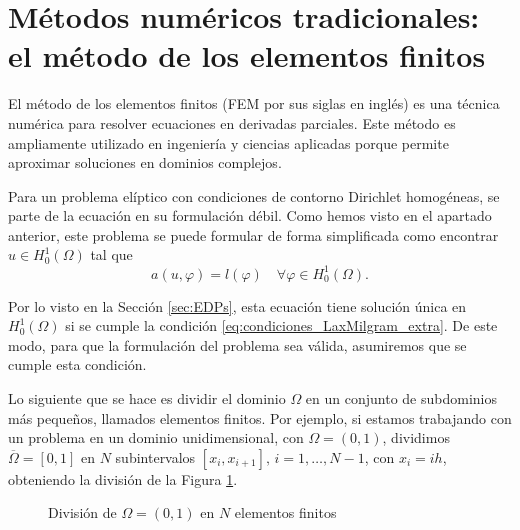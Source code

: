 \documentclass[a4paper,11pt,spanish, twoside, leqno]{tfg-uam}
\theoremstyle{definition}
\begin{document}
\section{Métodos numéricos tradicionales: el método de los elementos finitos}\label{sc:FEM}

El método de los elementos finitos (FEM por sus siglas en inglés) es una técnica numérica para resolver ecuaciones en derivadas parciales. Este método es ampliamente utilizado en ingeniería y ciencias aplicadas porque permite aproximar soluciones en dominios complejos.

Para un problema elíptico con condiciones de contorno Dirichlet homogéneas, se parte de la ecuación en su formulación débil. Como hemos visto en el apartado anterior, este problema se puede formular de forma simplificada como encontrar $u\in H_0^1(\Omega)$ tal que
\begin{equation*}
    a(u,\varphi) = l(\varphi) \quad \forall \varphi\in  H_0^1(\Omega).
\end{equation*}

Por lo visto en la Sección \ref{sec:EDPs}, esta ecuación tiene solución única en $H_0^1(\Omega)$ si se cumple la condición \eqref{eq:condiciones_LaxMilgram_extra}. De este modo, para que la formulación del problema sea válida, asumiremos que se cumple esta condición.

Lo siguiente que se hace es dividir el dominio $\Omega$ en un conjunto de subdominios más pequeños, llamados elementos finitos. Por ejemplo, si estamos trabajando con un problema en un dominio unidimensional, con $\Omega =(0,1)$, dividimos $\overline{\Omega} = [0,1]$ en $N$ subintervalos $[x_i,x_{i+1}], \, i = 1, \dots, N-1$, con $x_i = ih$, obteniendo la división de la Figura \ref{fig:DivisionOmega}.

\begin{figure}
    \centering
    \caption{División de $\Omega = (0,1)$ en $N$ elementos finitos}
    \label{fig:DivisionOmega}
\end{figure}
\end{document}
